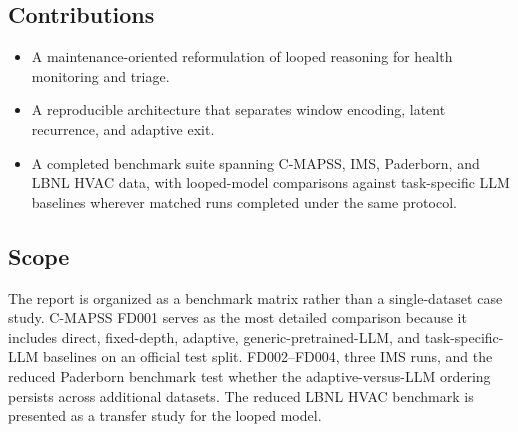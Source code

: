 \subsection{Contributions}
\begin{itemize}
    \item A maintenance-oriented reformulation of looped reasoning for health monitoring and triage.
    \item A reproducible architecture that separates window encoding, latent recurrence, and adaptive exit.
    \item A completed benchmark suite spanning C-MAPSS, IMS, Paderborn, and LBNL HVAC data, with looped-model comparisons against task-specific LLM baselines wherever matched runs completed under the same protocol.
\end{itemize}

\subsection{Scope}
The report is organized as a benchmark matrix rather than a single-dataset case study. C-MAPSS FD001 serves as the most detailed comparison because it includes direct, fixed-depth, adaptive, generic-pretrained-LLM, and task-specific-LLM baselines on an official test split. FD002--FD004, three IMS runs, and the reduced Paderborn benchmark test whether the adaptive-versus-LLM ordering persists across additional datasets. The reduced LBNL HVAC benchmark is presented as a transfer study for the looped model.

